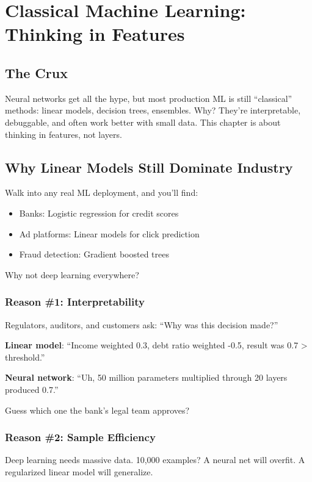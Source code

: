 \chapter{Classical Machine Learning: Thinking in Features}

\section{The Crux}
Neural networks get all the hype, but most production ML is still ``classical'' methods: linear models, decision trees, ensembles. Why? They're interpretable, debuggable, and often work better with small data. This chapter is about thinking in features, not layers.

\section{Why Linear Models Still Dominate Industry}

Walk into any real ML deployment, and you'll find:
\begin{itemize}
    \item Banks: Logistic regression for credit scores
    \item Ad platforms: Linear models for click prediction
    \item Fraud detection: Gradient boosted trees
\end{itemize}

Why not deep learning everywhere?

\subsection{Reason \#1: Interpretability}

Regulators, auditors, and customers ask: ``Why was this decision made?''

\textbf{Linear model}: ``Income weighted 0.3, debt ratio weighted -0.5, result was 0.7 > threshold.''

\textbf{Neural network}: ``Uh, 50 million parameters multiplied through 20 layers produced 0.7.''

Guess which one the bank's legal team approves?

\subsection{Reason \#2: Sample Efficiency}

Deep learning needs massive data. 10,000 examples? A neural net will overfit. A regularized linear model will generalize.

